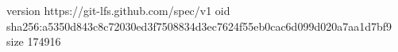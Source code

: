version https://git-lfs.github.com/spec/v1
oid sha256:a5350d843c8c72030ed3f7508834d3ec7624f55eb0cac6d099d020a7aa1d7bf9
size 174916
